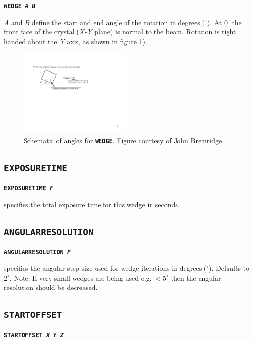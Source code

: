\documentclass[a4paper]{article}
\newcommand{\Keyword}[1]{\texttt{\textbf{#1}}\xspace}
\begin{document}
\Keyword{WEDGE \textit{A B}}

\textit{A} and \textit{B} define the start and end angle of the rotation in degrees ($^\circ$). At $0^\circ$ the front face of the crystal (\textit{X-Y} plane) is normal to the beam. Rotation is right handed about the \textit{Y} axis, as shown in figure \ref{fig:anglePhi}).
\begin{figure}[h!]
\centering
\includegraphics[width=0.5\textwidth]{Figs-for-Markus-from-JB-19-5-13-3.pdf}
\caption{Schematic of angles for \Keyword{WEDGE}. Figure courtesy of John Bremridge.}
\label{fig:anglePhi}
\end{figure}

\subsection{\Keyword{EXPOSURETIME}}

\noindent \Keyword{EXPOSURETIME \textit{F}}

specifies the total exposure time for this wedge in seconds.



\subsection{\Keyword{ANGULARRESOLUTION}}

\noindent \Keyword{ANGULARRESOLUTION \textit{F}}

specifies the angular step size used for wedge iterations in degrees ($^\circ$). Defaults to $2^\circ$.
\newline
Note: If very small wedges are being used e.g. $<5^{\circ}$ then the angular resolution should be decreased.



\subsection{\Keyword{STARTOFFSET}}

\noindent \Keyword{STARTOFFSET \textit{X Y Z}}
\end{document}
